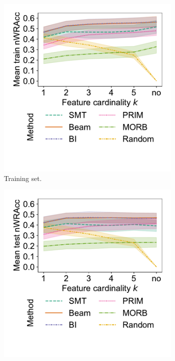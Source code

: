 \documentclass{article}
\theoremstyle{definition}
\begin{document}
\begin{figure}[t]
	\centering
	\begin{subfigure}[t]{0.48\textwidth}
		\centering
		\includegraphics[width=\textwidth, trim=20 60 15 15, clip]{plots/csd-cardinality-train-nwracc.pdf}
		\caption{Training set.}
		\label{fig:csd:cardinality-train-nwracc}
	\end{subfigure}
	\hfill
	\begin{subfigure}[t]{0.48\textwidth}
		\centering
		\includegraphics[width=\textwidth, trim=20 60 15 15, clip]{plots/csd-cardinality-test-nwracc.pdf}

\end{subfigure}
\end{figure}
\end{document}
